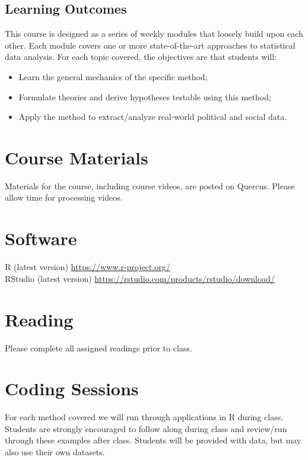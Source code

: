 \documentclass[12pt]{article}
\begin{document}
\subsection*{Learning Outcomes}
This course is designed as a series of weekly modules that loosely build upon each other. Each module covers one or more state-of-the-art approaches to statistical data analysis. For each topic covered, the objectives are that students will:

\begin{itemize}
\item Learn the general mechanics of the specific method; 
\item Formulate theories and derive hypotheses testable using this method;
\item Apply the method to extract/analyze real-world political and social data.

\end{itemize}

\section*{Course Materials}

Materials for the course, including course videos, are posted on Quercus. Please allow time for processing videos.

\section*{Software}
R (latest version) \url{https://www.r-project.org/}\\
RStudio (latest version) \url{https://rstudio.com/products/rstudio/download/}

\section*{Reading}
Please complete all assigned readings prior to class.


\section*{Coding Sessions}
For each method covered we will run through applications in R during class. Students are strongly encouraged to follow along during class and review/run through these examples after class. Students will be provided with data, but may also use their own datasets.
\end{document}
